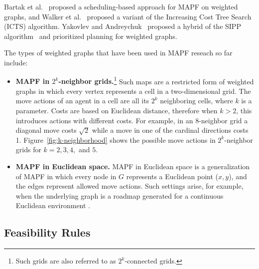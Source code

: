 \documentclass[letterpaper]{article} %
\newcommand{\mapf}{\ac{MAPF}\xspace}
\newcommand{\comment}[1]{{\nb{\textbf{Comment:}}{orange}{#1}}}
\begin{document}
Bartak et al.~ proposed a scheduling-based approach for \mapf on weighted graphs, and Walker et al.~ proposed a variant of the Increasing Cost Tree Search (ICTS) algorithm. Yakovlev and Andreychuk~ proposed a hybrid of the SIPP algorithm~\cite{phillips2011sipp} and prioritized planning for weighted graphs.

The types of weighted graphs that have been used in MAPF reseach so far include:
\begin{itemize}
    \item \textbf{MAPF in $2^k$-neighbor grids.}\footnote{Such grids are also referred to as $2^k$-connected grids.} Such maps are a restricted form of weighted graphs in which every vertex represents a cell in a two-dimensional grid. The move actions of an agent in a cell are all its $2^k$ neighboring cells, where $k$ is a parameter.
Costs are based on Euclidean distance, therefore when $k>2$, this introduces actions with different costs. For example, in an 8-neighbor grid a diagonal move costs $\sqrt{2}$ while a move in one of the cardinal directions costs 1. Figure~\ref{fig:k-neighborhood} shows the possible move actions in $2^k$-neighbor grids for $k=2, 3, 4,$ and $5$.


    \item \textbf{MAPF in Euclidean space.}
\mapf in Euclidean space is a generalization of \mapf in which every node in $G$ represents a Euclidean point ($x,y$), and the edges represent allowed move actions. Such settings arise, for example, when the underlying graph is a roadmap generated for a continuous Euclidean environment \cite{khatib1986real,wagner2012probabilistic}.

\end{itemize}


\subsection{Feasibility Rules}
\end{document}

